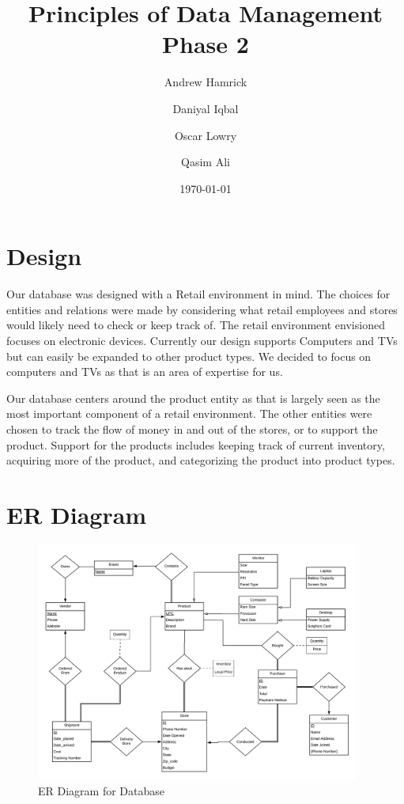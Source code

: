 \documentclass{article}
\title{Principles of Data Management\\\Large Phase 2\\\vspace{14pt}\Team}
\date{\today}
\author{
	Andrew Hamrick
	\and
	Daniyal Iqbal
	\and
	Oscar Lowry
	\and
	Qasim Ali
}
\begin{document}
	\maketitle
  \thispagestyle{empty}
	\newpage

	\section{Design}
		Our database was designed with a Retail environment in mind. The choices for
		entities and relations were made by considering what retail employees and
		stores would likely need to check or keep track of. The retail environment
		envisioned focuses on electronic devices. Currently our design supports
		Computers and TVs but can easily be expanded to other product types. We
		decided to focus on computers and TVs as that is an area of expertise for
		us.\\
		\vspace{0pt}

		Our database centers around the product entity as that is largely seen as
		the most important component of a retail environment. The other entities
		were chosen to track the flow of money in and out of the stores, or to
		support the product. Support for the products includes keeping track of
		current inventory, acquiring more of the product, and categorizing the
		product into product types.

	\section{ER Diagram}
    \begin{figure}[H]
      \centering
      \includegraphics[width=0.95\textwidth]{er_diagram}
      \caption{ER Diagram for Database}
      \label{fig:er}
    \end{figure}
\end{document}
